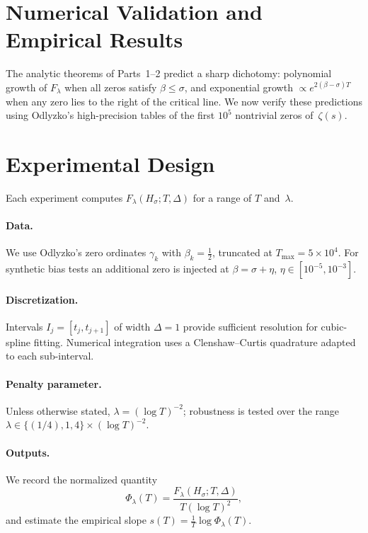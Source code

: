 
\section{Numerical Validation and Empirical Results}

The analytic theorems of Parts~1–2 predict a sharp dichotomy:
polynomial growth of $F_\lambda$ when all zeros satisfy $\beta\le\sigma$,
and exponential growth $\propto e^{2(\beta-\sigma)T}$ when any
zero lies to the right of the critical line.
We now verify these predictions using Odlyzko’s high-precision
tables of the first $10^5$ nontrivial zeros of~$\zeta(s)$.

\section{Experimental Design}

Each experiment computes $F_\lambda(H_\sigma;T,\Delta)$
for a range of $T$ and~$\lambda$.

\paragraph{Data.}
We use Odlyzko’s zero ordinates $\gamma_k$ with $\beta_k=\tfrac12$,
truncated at $T_{\max}=5\times10^4$.
For synthetic bias tests an additional zero is injected at
$\beta=\sigma+\eta$, $\eta\in[10^{-5},10^{-3}]$.

\paragraph{Discretization.}
Intervals $I_j=[t_j,t_{j+1}]$ of width $\Delta=1$
provide sufficient resolution for cubic-spline fitting.
Numerical integration uses a Clenshaw–Curtis quadrature
adapted to each sub-interval.

\paragraph{Penalty parameter.}
Unless otherwise stated, $\lambda=(\log T)^{-2}$;
robustness is tested over the range
$\lambda\in\{(1/4),1,4\}\times(\log T)^{-2}$.

\paragraph{Outputs.}
We record the normalized quantity
\[
\Phi_\lambda(T)
  = \frac{F_\lambda(H_\sigma;T,\Delta)}{T(\log T)^2},
\tag{11.1}
\]
and estimate the empirical slope
$s(T)=\tfrac{1}{T}\log\Phi_\lambda(T)$.

